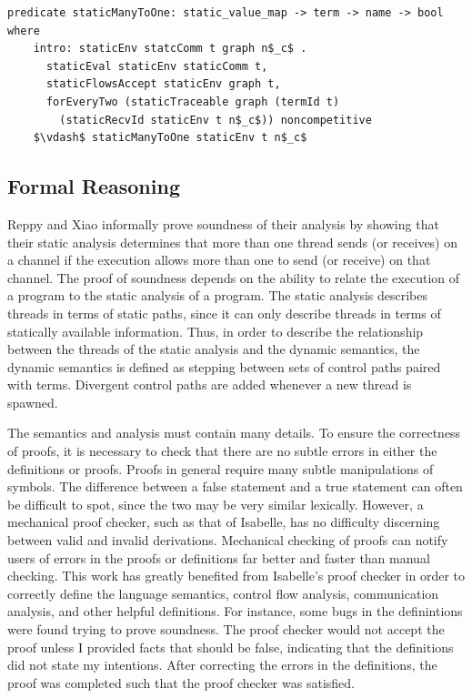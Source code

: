 \documentclass[letterpaper, 11pt]{extarticle}
\begin{document}
\begin{lstlisting}[language=logic, mathescape]
  predicate staticManyToOne: static_value_map -> term -> name -> bool where
    intro: staticEnv statcComm t graph n$_c$ .
      staticEval staticEnv staticComm t,
      staticFlowsAccept staticEnv graph t,
      forEveryTwo (staticTraceable graph (termId t)
        (staticRecvId staticEnv t n$_c$)) noncompetitive
    $\vdash$ staticManyToOne staticEnv t n$_c$
\end{lstlisting}

\subsection{Formal Reasoning}

Reppy and Xiao informally prove soundness of their analysis by showing that their static analysis
determines that more than one thread sends (or receives) on a channel if the execution allows more
than one to send (or receive) on that channel. The proof of soundness depends on the
ability to relate the execution of a program to the static analysis of a program. The static
analysis describes threads in terms of static paths, since it can only describe threads in
terms of statically available information. Thus, in order to describe the relationship between
the threads of the static analysis and the dynamic semantics, the dynamic semantics is
defined as stepping between sets of control paths paired with terms. Divergent control paths
are added whenever a new thread is spawned.

The semantics and analysis must contain many details. To ensure the
correctness of proofs, it is necessary to check that there are no subtle errors in either the 
definitions or proofs. Proofs in general require many subtle manipulations of symbols. The
difference between a false statement and a true statement can often be difficult to spot, since
the two may be very similar lexically. However, a mechanical proof checker, such as that of 
Isabelle, has no difficulty discerning between valid and invalid derivations.
Mechanical checking of proofs can notify users of errors in the proofs or definitions far better
and faster than manual checking. This work has greatly benefited from Isabelle's proof checker in
order to correctly define the language semantics, control flow analysis, communication analysis,
and other helpful definitions. For instance, some bugs in the
definintions were found trying to prove
soundness. The proof checker would not accept the proof unless I provided facts that
should be false, indicating that the definitions did not state my intentions.
After correcting the errors in the definitions, the proof was completed such that the proof
checker was satisfied.
\end{document}

